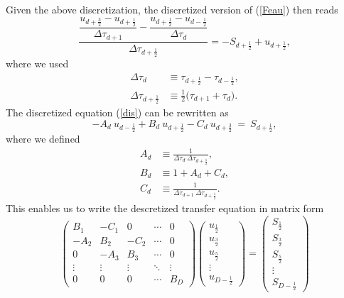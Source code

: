 \documentclass[]{article}
\begin{document}
Given the above discretization, the discretized version of (\ref{Feau}) then reads
\begin{equation}
\frac{\dfrac{u_{d+\frac{3}{2}}-u_{d+\frac{1}{2}}}{\Delta\tau_{d+1}}-\dfrac{u_{d+\frac{1}{2}}-u_{d-\frac{1}{2}}}{\Delta\tau_{d}}}{\Delta\tau_{d+\frac{1}{2}}} = - S_{d+\frac{1}{2}} + u_{d+\frac{1}{2}} ,
\label{dis}
\end{equation}
where we used
\begin{equation}
\begin{split}
\Delta\tau_{d} &\equiv \tau_{d+\frac{1}{2}} - \tau_{d-\frac{1}{2}} , \\
\Delta\tau_{d+\frac{1}{2}} &\equiv \frac{1}{2}\big(  \tau_{d+1} + \tau_{d}\big) .
\end{split}
\end{equation}
The discretized equation (\ref{dis}) can be rewritten as
\begin{equation}
-A_{d} \ u_{d-\frac{1}{2}} + B_{d} \ u_{d+\frac{1}{2}}  -C_{d} \ u_{d+\frac{3}{2}} \ = \ S_{d+\frac{1}{2}},
\label{rec}
\end{equation}
where we defined
\begin{equation}
\begin{split}
A_{d} &\equiv \frac{1}{\Delta\tau_{d} \ \Delta\tau_{d+\frac{1}{2}}} , \\
B_{d} &\equiv 1  + A_{d} + C_{d} , \\
C_{d} &\equiv \frac{1}{\Delta\tau_{d+1} \ \Delta\tau_{d+\frac{1}{2}}} .
\end{split}
\end{equation}
This enables us to write the descretized transfer equation in matrix form
\begin{equation}
\left( \begin{matrix}
B_{1} & -C_{1} & 0 & \cdots & 0 \\
-A_{2} & B_{2} & -C_{2} & \cdots & 0 \\
0 & -A_{3} & B_{3} & \cdots & 0 \\
\vdots & \vdots & \vdots & \ddots & \vdots \\
0 & 0 & 0 & \cdots & B_{D}
\end{matrix}\right)
\left( \begin{matrix}
u_{\frac{1}{2}} \\ u_{\frac{3}{2}} \\ u_{\frac{5}{2}} \\ \vdots \\ u_{D-\frac{1}{2}}
\end{matrix}\right)  = \left( \begin{matrix}
S_{\frac{1}{2}} \\ S_{\frac{3}{2}} \\ S_{\frac{5}{2}} \\ \vdots \\ S_{D-\frac{1}{2}}
\end{matrix}\right)
\end{equation}
\end{document}
